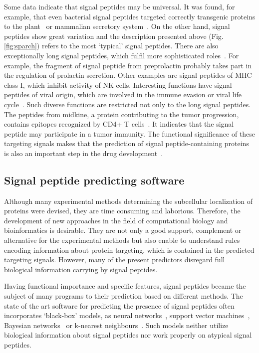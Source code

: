 \documentclass[fleqn,10pt,twoside]{gcb15submission}
\begin{document}
Some data indicate that signal peptides may be universal. It was found, for example, that even bacterial signal peptides targeted correctly transgenic proteins to the plant~\citep{2009moellera} or mammalian secretory system~\citep{2014naganoestablishment}. On the other hand, signal peptides show great variation and the description presented above (Fig. \ref{fig:sparch}) refers to the most ‘typical’ signal peptides. There are also exceptionally long signal peptides, which fulfil more sophisticated roles~\citep{2009hissarchitecture}. For example, the fragment of signal peptide from preprolactin probably takes part in the regulation of prolactin secretion. Other examples are signal peptides of MHC class I, which inhibit activity of NK cells. Interesting functions have signal peptides of viral origin, which are involved in the immune evasion or viral life cycle~\citep{2000kappposttargeting}. Such diverse functions are restricted not only to the long signal peptides. The peptides from midkine, a protein contributing to the tumor progression, contains epitopes recognized by CD4+ T cells~\citep{2013kerzerhothe}. It indicates that the signal peptide may participate in a tumor immunity. The functional significance of these targeting signals makes that the prediction of signal peptide-containing proteins is also an important step in the drug development~\citep{2005zhangalteration, 2012netoadeimproving, 2010moellerwetmilling}.


\subsection*{Signal peptide predicting software}

Although many experimental methods determining the subcellular localization of proteins were devised, they are time consuming and laborious. Therefore, the development of new approaches in the field of computational biology and bioinformatics is desirable. They are not only a good support, complement or alternative for the experimental methods but also enable to understand rules encoding information about protein targeting, which is contained in the predicted targeting signals. However, many of the present predictors disregard full biological information carrying by signal peptides.

Having functional importance and specific features, signal peptides became the subject of many programs to their prediction based on different methods. The state of the art software for predicting the presence of signal peptides often incorporates ‘black-box’ models, as neural networks~\citep{2011petersensignalp}, support vector machines~\citep{2014zhangprediction}, Bayesian networks~\citep{2012zhengsignalbnf} or k-nearest neighbours~\citep{2007shensignall}. Such models neither utilize biological information about signal peptides nor work properly on atypical signal peptides. 
\end{document}
